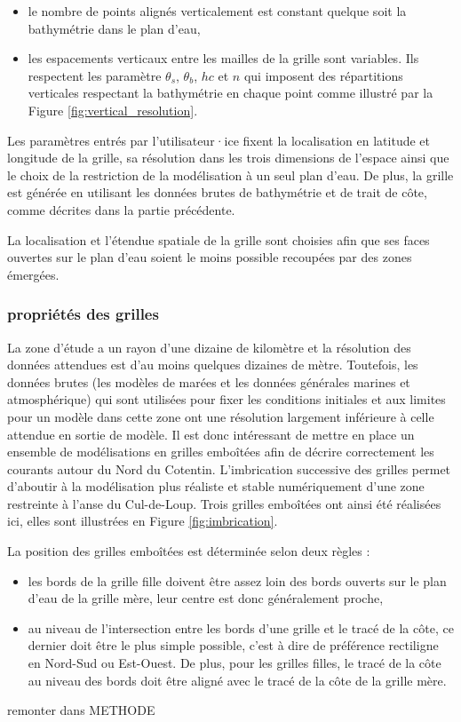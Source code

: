 \documentclass[10pt,a4paper,titlepage]{article}
\begin{document}
\begin{itemize}
    \item le nombre de points alignés verticalement est constant quelque soit la bathymétrie dans le plan d'eau,
    \item les espacements verticaux entre les mailles de la grille sont variables. Ils respectent les paramètre $\theta_s$, $\theta_b$, $hc$ et $n$ qui imposent des répartitions verticales respectant la bathymétrie en chaque point comme illustré par la Figure \ref{fig:vertical_resolution}.
\end{itemize}


Les paramètres entrés par l'utilisateur·ice fixent la localisation en latitude et longitude de la grille, sa résolution dans les trois dimensions de l'espace ainsi que le choix de la restriction de la modélisation à un seul plan d'eau.
De plus, la grille est générée en utilisant les données brutes de bathymétrie et de trait de côte, comme décrites dans la partie précédente.

La localisation et l'étendue spatiale de la grille sont choisies afin que ses faces ouvertes sur le plan d'eau soient le moins possible recoupées par des zones émergées.


\subsubsection{propriétés des grilles}
\label{subsub:propriete_gilles_ADCL}

La zone d'étude a un rayon d'une dizaine de kilomètre et la résolution des données attendues est d'au moins quelques dizaines de mètre.
Toutefois, les données brutes (les modèles de marées et les données générales marines et atmosphérique) qui sont utilisées pour fixer les conditions initiales et aux limites pour un modèle dans cette zone ont une résolution largement inférieure à celle attendue en sortie de modèle.
Il est donc intéressant de mettre en place un ensemble de modélisations en grilles emboîtées afin de décrire correctement les courants autour du Nord du Cotentin.
L'imbrication successive des grilles permet d'aboutir à la modélisation plus réaliste et stable numériquement d'une zone restreinte à l'anse du Cul-de-Loup.
Trois grilles emboîtées ont ainsi été réalisées ici, elles sont illustrées en Figure \ref{fig:imbrication}.


La position des grilles emboîtées est déterminée selon deux règles :
\begin{itemize}
    \item les bords de la grille fille doivent être assez loin des bords ouverts sur le plan d'eau de la grille mère, leur centre est donc généralement proche,
    \item au niveau de l'intersection entre les bords d'une grille et le tracé de la côte, ce dernier doit être le plus simple possible, c'est à dire de préférence rectiligne en Nord-Sud ou Est-Ouest.
    De plus, pour les grilles filles, le tracé de la côte au niveau des bords doit être aligné avec le tracé de la côte de la grille mère.
\end{itemize}\alert{remonter dans METHODE}
\end{document}
